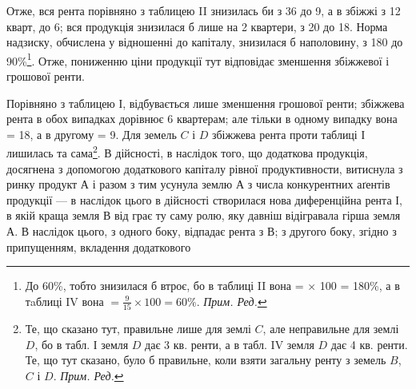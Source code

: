 Отже, вся рента порівняно з таблицею II знизилась би з 36
до 9, а в збіжжі з 12 кварт, до 6; вся продукція знизилася б лише на 2
квартери, з 20 до 18. Норма надзиску, обчислена у відношенні до капіталу,
знизилася б наполовину, з 180 до 90\%\footnote*{
До 60\%, тобто знизилася б втроє, бо в таблиці II вона =  × 100 = 180\%, а в тaблиці
IV вона $= \frac{9}{15} × 100 = 60\%$. \emph{Прим. Ред.}
}. Отже, пониженню ціни продукції
тут відповідає зменшення збіжжевої і грошової ренти.

Порівняно з таблицею І, відбувається лише зменшення грошової ренти;
збіжжева рента в обох випадках дорівнює 6 квартерам; але тільки в одному
випадку вона = 18, а в другому = 9. Для земель $C$ і $D$
збіжжева рента проти таблиці І лишилась та сама\footnote*{
Те, що сказано тут, правильне лише для землі $C$, але неправильне для землі $D$, бо в табл. І земля
$D$ дає 3 кв. ренти, а в табл. IV земля $D$ дає 4 кв. ренти. Те, що тут сказано, було б правильне, коли
взяти загальну ренту з земель $B$, $C$ і $D$. \emph{Прим. Ред.}
}. В дійсності, в наслідок
того, що додаткова продукція, досягнена з допомогою додаткового капіталу рівної
продуктивности, витиснула з ринку продукт $А$ і разом з тим усунула землю $А$
з числа конкурентних аґентів продукції — в наслідок цього в дійсності створилася
нова диференційна рента І, в якій краща земля $В$ від грає ту саму ролю,
яку давніш відігравала гірша земля $А$. В наслідок цього, з одного боку, відпадає
рента з $В$; з другого боку, згідно з припущенням, вкладення додаткового
\parbreak{}  %
